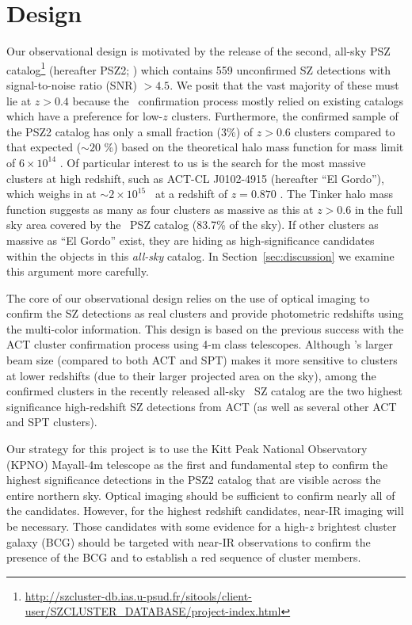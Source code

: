 \documentclass[apj, revtex4-1]{emulateapj}
\begin{document}
\section{Design}\label{sec:design}
Our observational design is motivated by the release of the second, all-sky PSZ catalog\footnote{\url{http://szcluster-db.ias.u-psud.fr/sitools/client-user/SZCLUSTER_DATABASE/project-index.html}} (hereafter PSZ2; \citealt{PlanckCollaboration2015a}) which contains 559 unconfirmed SZ detections with signal-to-noise ratio (SNR) $> 4.5$. We posit that the vast majority of these must lie at $z>0.4$ because the \planck\ confirmation process \citep{PlanckCollaboration2014} mostly relied on existing catalogs which have a preference for low-$z$ clusters. Furthermore, the confirmed sample of the PSZ2 catalog has only a small fraction (3\%) of $z > 0.6$ clusters compared to that expected ($\sim20$
\%) based on the theoretical halo mass function  for mass limit of $6\times10^{14}$ \msol. Of particular interest to us is the search for the most massive clusters at high redshift, such as ACT-CL J0102-4915 (hereafter ``El Gordo''), which weighs in at $\sim2 \times 10^{15}$ \msol\ at a redshift of $z=0.870$ \citep{Menanteau2012}. The Tinker halo mass function suggests as many as four clusters as massive as this at $z>0.6$ in the full sky area covered by the \planck\ PSZ catalog (83.7\% of the sky). If other clusters as massive as ``El Gordo'' exist, they are hiding as high-significance candidates within the objects in this \textit{all-sky} catalog. In Section~\ref{sec:discussion} we examine this argument more carefully.

The core of our observational design relies on the use of optical imaging to confirm the SZ detections as real clusters and provide photometric redshifts using the multi-color information. This design is based on the previous success with the ACT cluster confirmation process using 4-m class telescopes. Although \planck’s larger beam size (compared to both ACT and SPT) makes it more sensitive to clusters at lower redshifts (due to their larger projected area on the sky), among the confirmed clusters in the recently released all-sky \planck\ SZ catalog are the two highest significance high-redshift SZ detections from ACT (as well as several other ACT and SPT clusters).

Our strategy for this project is to use the Kitt Peak National Observatory (KPNO) Mayall-4m telescope as the first and fundamental step to confirm the highest significance detections in the PSZ2 catalog that are visible across the entire northern sky. Optical imaging should be sufficient to confirm nearly all of the candidates. However, for the highest redshift candidates, near-IR imaging will be necessary. Those candidates with some evidence for a high-$z$ brightest cluster galaxy (BCG) should be targeted with near-IR observations to confirm the presence of the BCG and to establish a red sequence of cluster members.
\end{document}
